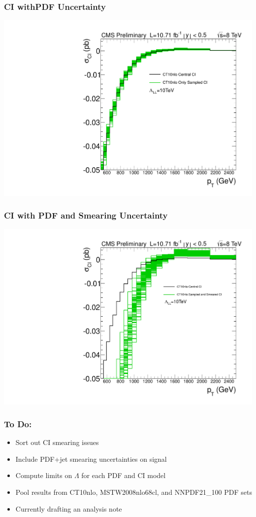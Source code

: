 \documentclass{beamer}
\begin{document}
\begin{frame}
	\frametitle{CI  withPDF Uncertainty}
	\begin{*figure}
\begin{center}
 \vspace {0.05 in}
 \includegraphics [width=0.7\linewidth] {10000_LL_sampled_xsec_CT10.pdf}
 \vspace {0.05 in}
\caption{ }
\end{center}
\end{*figure} 
\end{frame}

\begin{frame}
	\frametitle{CI  with PDF and Smearing Uncertainty}
	\begin{*figure}
\begin{center}
 \vspace {0.05 in}
 \includegraphics [width=0.7\linewidth] {10000_LL_sampled_and_smeared_xsec_CT10.pdf}
 \vspace {0.05 in}
\caption{ }
\end{center}
\end{*figure} 
\end{frame}

\begin{frame}
	\frametitle{To Do:}
	\begin{itemize}
		\item Sort out CI smearing issues
		\item Include PDF+jet smearing uncertainties on signal
		\item Compute limits on $\Lambda$ for each PDF and CI model
		\item Pool results from CT10nlo, MSTW2008nlo68cl, and NNPDF21\_100 PDF sets
		\item Currently drafting an analysis note
	\end{itemize}
\end{frame}
\end{document}
